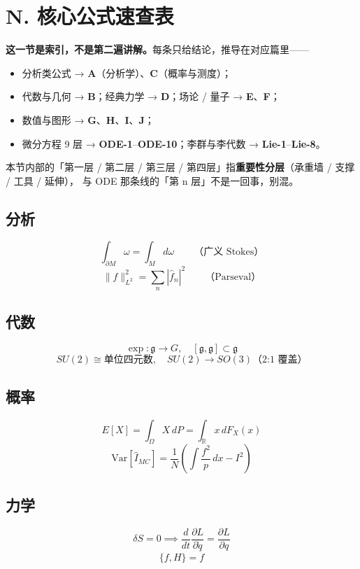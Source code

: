 \section{N. 核心公式速查表}

\noindent\textbf{这一节是索引，不是第二遍讲解。}每条只给结论，推导在对应篇里——
\begin{itemize}[leftmargin=1.4em,itemsep=0pt]
\item 分析类公式 → \textbf{A}（分析学）、\textbf{C}（概率与测度）；
\item 代数与几何 → \textbf{B}；经典力学 → \textbf{D}；场论 / 量子 → \textbf{E}、\textbf{F}；
\item 数值与图形 → \textbf{G}、\textbf{H}、\textbf{I}、\textbf{J}；
\item 微分方程 9 层 → \textbf{ODE-1}--\textbf{ODE-10}；李群与李代数 → \textbf{Lie-1}--\textbf{Lie-8}。
\end{itemize}
本节内部的「第一层 / 第二层 / 第三层 / 第四层」指\textbf{重要性分层}（承重墙 / 支撑 / 工具 / 延伸），
与 ODE 那条线的「第 n 层」不是一回事，别混。

\subsection{分析}
\[
\int_{\partial M} \omega = \int_M d\omega \qquad \text{（广义 Stokes）}
\]
\[
\|f\|_{L^2}^2 = \sum_n |\hat{f}_n|^2 \qquad \text{（Parseval）}
\]

\subsection{代数}
\[
\exp: \mathfrak{g} \to G, \quad [\mathfrak{g}, \mathfrak{g}] \subset \mathfrak{g}
\]
\[
SU(2) \cong \text{单位四元数}, \quad SU(2) \to SO(3) \text{（2:1 覆盖）}
\]

\subsection{概率}
\[
E[X] = \int_\Omega X\,dP = \int_{\mathbb{R}} x\,dF_X(x)
\]
\[
\text{Var}[\hat{I}_{MC}] = \frac{1}{N}\left(\int \frac{f^2}{p}\,dx - I^2\right)
\]

\subsection{力学}
\[
\delta S = 0 \implies \frac{d}{dt}\frac{\partial L}{\partial \dot{q}} = \frac{\partial L}{\partial q}
\]
\[
\{f, H\} = \dot{f}
\]

